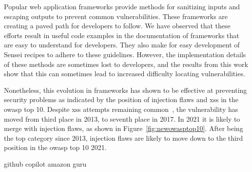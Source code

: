 Popular web application frameworks provide methods for sanitizing inputs and escaping outputs to prevent common vulnerabilities.
These frameworks are creating a paved path for developers to follow.
We have observed that these efforts result in useful code examples in the documentation of frameworks that are easy to understand for developers.
They also make for easy development of Sensei recipes to adhere to these guidelines.
However, the implementation details of these methods are sometimes lost to developers, and the results from this work show that this can sometimes lead to increased difficulty locating vulnerabilities.

Nonetheless, this evolution in frameworks has shown to be effective at preventing security problems as indicated by the position of injection flaws and \gls{xss} in the \gls{owasp} top 10.
Despite \gls{xss} attempts remaining common~\cite{trustwave}, the vulnerability has moved from third place in 2013, to seventh place in 2017.
In 2021 it is likely to merge with injection flaws, as shown in Figure~\ref{fig:newowasptop10}.
After being the top category since 2013, injection flaws are likely to move down to the third position in the \gls{owasp} top 10 2021.




github copilot
amazon guru